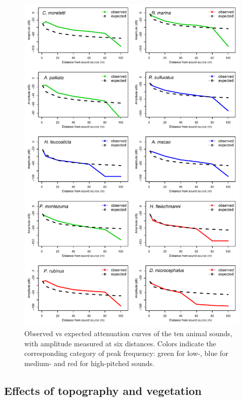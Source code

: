 \documentclass[fleqn,10pt,lineno]{wlpeerj} %
\begin{document}
\begin{figure}

{\centering \includegraphics[width=1\linewidth]{ASR_MyPaper_2020_files/figure-latex/curvesxspp-1} 

}

\caption{Observed vs expected attenuation curves of the ten animal sounds, with amplitude measured at six distances. Colors indicate the corresponding category of peak frequency: green for low-, blue for medium- and red for high-pitched sounds.\label{fig:curvesxspp}}\label{fig:curvesxspp}
\end{figure}

\hypertarget{effects-of-topography-and-vegetation-1}{%
\subsection*{Effects of topography and
vegetation}\label{effects-of-topography-and-vegetation-1}}
\end{document}
